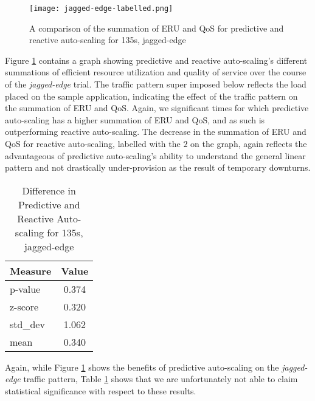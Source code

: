 \begin{figure}[!h]
  \centerline{\texttt{[image: jagged-edge-labelled.png]}}
  \caption{A comparison of the summation of ERU and QoS for
    predictive and reactive auto-scaling for 135s, jagged-edge}
  \label{fig:135s-jagged-edge-labelled}
\end{figure}


Figure \ref{fig:135s-jagged-edge-labelled} contains a graph
showing predictive and reactive auto-scaling's different
summations of efficient resource utilization and quality of service over the
course of the \textit{jagged-edge} trial.
The traffic pattern super imposed below reflects the load
placed on the sample application, indicating the effect of the traffic pattern
on the summation of ERU and QoS. Again, we significant times for which
predictive auto-scaling has a higher summation of ERU and QoS, and as such is
outperforming reactive auto-scaling. The decrease in the summation of ERU and
QoS for reactive auto-scaling, labelled with the $2$ on the graph, again
reflects the advantageous of predictive auto-scaling's ability to understand the
general linear pattern and not drastically under-provision as the result of
temporary downturns.

\begin{table}[htbp]
  \centering
  \caption{Difference in Predictive and Reactive Auto-scaling for 135s, jagged-edge}
  \label{tab:135s-jagged-edge}
\begin{tabular}{l c}\hline\hline
    \multicolumn{1}{c}{\textbf{Measure}} & \textbf{Value} \\ \hline
     p-value & 0.374 \\
     z-score & 0.320 \\
     std\_dev & 1.062 \\
     mean & 0.340
  \end{tabular}
\end{table}

Again, while Figure \ref{fig:135s-jagged-edge-labelled} shows the benefits of predictive
auto-scaling on the \textit{jagged-edge} traffic pattern, Table
\ref{tab:135s-jagged-edge} shows that we are unfortunately not able to claim
statistical significance with respect to these results.
